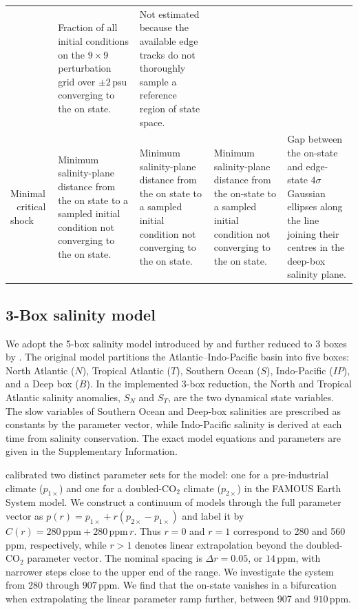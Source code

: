 \documentclass[12pt, a4paper]{article}
\newcommand{\psu}{\,\text{psu}}
\newcommand{\CO}{CO\ensuremath{_2}}
\begin{document}
\begin{table}
\begin{tabular}{p{2.3cm} p{4.5cm} p{4.5cm} p{4.5cm} p{4.5cm}}
      & Fraction of all initial conditions on the $9\times9$ perturbation grid over $\pm 2\psu{}$ converging to the on state.
      & Not estimated because the available edge tracks do not thoroughly sample a reference region of state space. \\[6pt]
    Minimal \,\,\,\,critical shock
      & Minimum salinity-plane distance from the on state to a sampled initial condition not converging to the on state.
      & Minimum salinity-plane distance from the on state to a sampled initial condition not converging to the on state.
      & Minimum salinity-plane distance from the on-state to a sampled initial condition not converging to the on state.
      & Gap between the on-state and edge-state $4\sigma$ Gaussian ellipses along the line joining their centres in the deep-box salinity plane. \\
    \bottomrule
  \end{tabular}
\end{table}



\subsection{3-Box salinity model}
\label{sec:methods:boxmodel}

We adopt the 5-box salinity model introduced by \citet{Wood20195BoxModel} and further reduced to 3 boxes by \citet{Alkhayuon2019AMOCRateTipping}. The original model partitions the Atlantic--Indo-Pacific basin into five boxes: North Atlantic ($N$), Tropical Atlantic ($T$), Southern Ocean ($S$), Indo-Pacific ($IP$), and a Deep box ($B$). In the implemented 3-box reduction, the North and Tropical Atlantic salinity anomalies, $S_N$ and $S_T$, are the two dynamical state variables. The slow variables of Southern Ocean and Deep-box salinities are prescribed as constants by the parameter vector, while Indo-Pacific salinity is derived at each time from salinity conservation. The exact model equations and parameters are given in the Supplementary Information.

\citet{Wood20195BoxModel} calibrated two distinct parameter sets for the model: one for a pre-industrial climate ($p_{1\times}$) and one for a doubled-\CO{} climate ($p_{2\times}$) in the FAMOUS Earth System model. We construct a continuum of models through the full parameter vector as $p(r)=p_{1\times}+r(p_{2\times}-p_{1\times})$ and label it by $C(r)=280\,\text{ppm}+280\,\text{ppm}\,r$. Thus $r=0$ and $r=1$ correspond to 280 and 560 ppm, respectively, while $r>1$ denotes linear extrapolation beyond the doubled-\CO{} parameter vector. The nominal spacing is $\Delta r=0.05$, or $14\,\text{ppm}$, with narrower steps close to the upper end of the range. We investigate the system from 280 through $907\,\text{ppm}$. We find that the on-state vanishes in a bifurcation when extrapolating the linear parameter ramp further, between 907 and $910\,\text{ppm}$.
\end{document}
